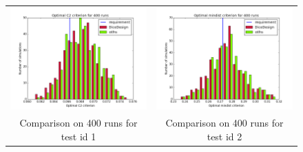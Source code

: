 \begin{figure}[!h]
\begin{center}
\begin{tabular}{cc}
 \includegraphics[scale=0.4]{comp_c2_small.png} & \includegraphics[scale=0.4]{comp_mindist_small.png}\\
 Comparison on 400 runs for test id 1 & Comparison on 400 runs for test id 2\\

\end{tabular}
\end{center}
\end{figure}
